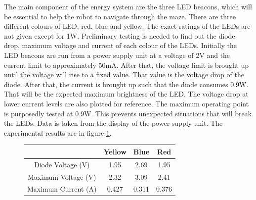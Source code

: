 The main component of the energy system are the three LED beacons, which will be essential to help the robot to navigate through the maze. There are three different colours of LED, red, blue and yellow. The exact ratings of the LEDs are not given except for 1W. Preliminary testing is needed to find out the diode drop, maximum voltage and current of each colour of the LEDs. Initially the LED beacons are run from a power supply unit at a voltage of 2V and the current limit to approximately 50mA. After that, the voltage limit is brought up until the voltage will rise to a fixed value. That value is the voltage drop of the diode. After that, the current is brought up such that the diode consumes 0.9W. That will be the expected maximum brightness of the LED. The voltage drop at lower current levels are also plotted for reference. The maximum operating point is purposedly tested at 0.9W. This prevents unexpected situations that will break the LEDs. Data is taken from the display of the power supply unit. The experimental results are in figure \ref{tbl:led}.

\begin{figure}
    \centering
    \begin{tabular}{ |c|c|c|c|}
        \hline
                            & Yellow & Blue  & Red   \\
        \hline
        Diode Voltage (V)   & 1.95   & 2.69  & 1.95  \\
        \hline
        Maximum Voltage (V) & 2.32   & 3.09  & 2.41  \\
        \hline
        Maximum Current (A) & 0.427  & 0.311 & 0.376 \\
        \hline
    \end{tabular}
    \caption{}
    \label{tbl:led}
\end{figure}

